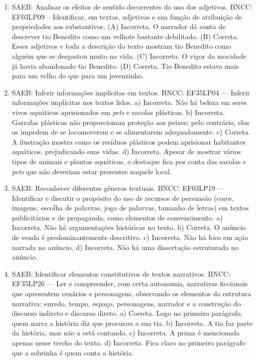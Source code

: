 \begin{enumerate}
\item
SAEB: Analisar os efeitos de sentido decorrentes do uso dos adjetivos.
BNCC: EF03LP09 -- Identificar, em textos, adjetivos e sua função de atribuição de propriedades
aos substantivos.
(A) Incorreta. O narrador dá conta de descrever tio Benedito como um velhote bastante debilitado.
(B) Correta. Esses adjetivos e toda a descrição do texto mostram tio Benedito como alguém que se desgastou muito na vida.
(C) Incorreta. O vigor da mocidade já havia abandonado tio Benedito.
(D) Correta. Tio Benedito estava mais para um velho do que para um jovenzinho.

\item
SAEB: Inferir informações implícitas em textos. BNCC: EF35LP04 --- Inferir informações implícitas nos textos lidos. a) Incorreta. Não há beleza em seres vivos aquáticos aprisionados em \emph{pets} e sacolas plásticas. b) Incorreta. Garrafas plásticas não proporcionam proteção aos peixes; pelo contrário, elas os impedem de se locomoverem e se alimentarem adequadamente. c) Correta. A ilustração mostra como os resíduos plásticos podem aprisionar habitantes aquáticos, prejudicando suas vidas. d) Incorreta. Apesar de mostrar vários tipos de animais e plantas aquáticas, o destaque fica por conta das sacolas e \emph{pets} que não deveriam estar presentes naquele local.

\item
SAEB: Reconhecer diferentes gêneros textuais. BNCC: EF03LP19 --- Identificar e discutir o propósito do uso de recursos de persuasão (cores, imagens, escolha de palavras, jogo de palavras, tamanho de letras) em textos publicitários e de propaganda, como elementos de convencimento. a) Incorreta. Não há argumentações históricas no texto. b) Correta. O anúncio de venda é predominantemente descritivo. c) Incorreta. Não há foco em ação narrada no anúncio. d) Incorreta. Não há uma dissertação estruturada no anúncio.

\item
SAEB: Identificar elementos constitutivos de textos narrativos. BNCC: EF35LP26 --- Ler e compreender, com certa autonomia, narrativas ficcionais que apresentem cenários e personagens, observando os elementos da estrutura narrativa: enredo, tempo, espaço, personagens, narrador e a construção do discurso indireto e discurso direto. a) Correta. Logo no primeiro parágrafo, quem narra a história diz que procurou a sua tia. b) Incorreta. A tia faz parte da história, mas não a está contando. c) Incorreta. A prima é mencionada apenas nesse trecho do texto. d) Incorreta. Fica claro no primeiro parágrafo que a sobrinha é quem conta a história.


\end{enumerate}
